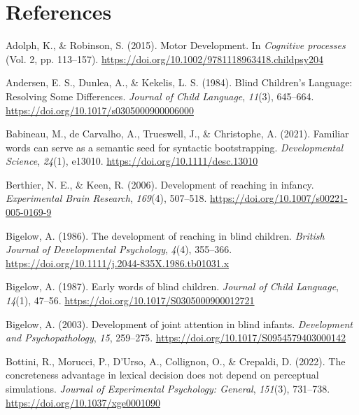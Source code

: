 \documentclass[
  man,floatsintext]{apa6}
\newlength{\cslhangindent}
\newlength{\cslentryspacingunit} %
\newenvironment{CSLReferences}[2] %
 {%
  \setlength{\parindent}{0pt}
  \ifodd #1
  \let\oldpar\par
  \def\par{\hangindent=\cslhangindent\oldpar}
  \fi
  \setlength{\parskip}{#2\cslentryspacingunit}
 }%
 {}
\begin{document}
\hypertarget{references}{%
\section*{References}\label{references}}

\hypertarget{refs}{}
\begin{CSLReferences}{1}{0}
\leavevmode{}%
Adolph, K., \& Robinson, S. (2015). Motor {Development}. In \emph{Cognitive processes} (Vol. 2, pp. 113--157). \url{https://doi.org/10.1002/9781118963418.childpsy204}

\leavevmode{}%
Andersen, E. S., Dunlea, A., \& Kekelis, L. S. (1984). Blind {Children}'s {Language}: {Resolving Some Differences}. \emph{Journal of Child Language}, \emph{11}(3), 645--664. \url{https://doi.org/10.1017/s0305000900006000}

\leavevmode{}%
Babineau, M., de Carvalho, A., Trueswell, J., \& Christophe, A. (2021). Familiar words can serve as a semantic seed for syntactic bootstrapping. \emph{Developmental Science}, \emph{24}(1), e13010. \url{https://doi.org/10.1111/desc.13010}

\leavevmode{}%
Berthier, N. E., \& Keen, R. (2006). Development of reaching in infancy. \emph{Experimental Brain Research}, \emph{169}(4), 507--518. \url{https://doi.org/10.1007/s00221-005-0169-9}

\leavevmode{}%
Bigelow, A. (1986). The development of reaching in blind children. \emph{British Journal of Developmental Psychology}, \emph{4}(4), 355--366. \url{https://doi.org/10.1111/j.2044-835X.1986.tb01031.x}

\leavevmode{}%
Bigelow, A. (1987). Early words of blind children. \emph{Journal of Child Language}, \emph{14}(1), 47--56. \url{https://doi.org/10.1017/S0305000900012721}

\leavevmode{}%
Bigelow, A. (2003). Development of joint attention in blind infants. \emph{Development and Psychopathology}, \emph{15}, 259--275. \url{https://doi.org/10.1017/S0954579403000142}

\leavevmode{}%
Bottini, R., Morucci, P., D'Urso, A., Collignon, O., \& Crepaldi, D. (2022). The concreteness advantage in lexical decision does not depend on perceptual simulations. \emph{Journal of Experimental Psychology: General}, \emph{151}(3), 731--738. \url{https://doi.org/10.1037/xge0001090}


\end{CSLReferences}
\end{document}
